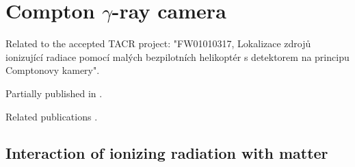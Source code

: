 \documentclass[a4paper,11pt,titlepage,twoside]{book}
\newcommand{\chapternoclear}[1]{
  \begingroup
  \let\cleardoublepage\clearpage
  \chapter{#1}
  \endgroup
}
\begin{document}
\chapternoclear{Compton $\gamma$-ray camera}

Related to the accepted TACR project: "FW01010317, Lokalizace zdrojů ionizující radiace pomocí malých bezpilotních helikoptér s detektorem na principu Comptonovy kamery".

Partially published in \cite{baca2019timepix}.

Related publications \cite{baca2019timepix, stibinger2020localization, baca2018rospix}.


\section{Interaction of ionizing radiation with matter}

\end{document}

